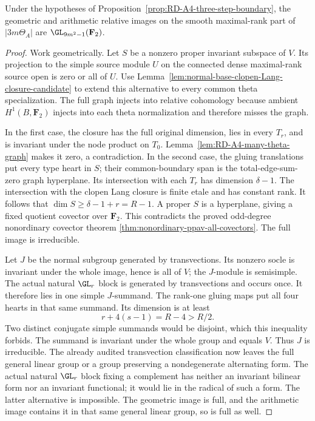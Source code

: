 \begin{theorem}
\label{thm:RD-A4-three-step}
Under the hypotheses of Proposition~\ref{prop:RD-A4-three-step-boundary},
the geometric and arithmetic relative images on the smooth
maximal-rank part of $|3m\Theta_A|$ are
$\GL_{9m^2-1}(\mathbf F_2)$.
\end{theorem}
\begin{proof}
Work geometrically.  Let $S$ be a nonzero proper invariant
subspace of $V$.  Its projection to the simple source module $U$
on the connected dense maximal-rank source open is zero or all
of $U$.  Use Lemma~\ref{lem:normal-base-clopen-Lang-closure-candidate}
to extend this alternative to every common theta specialization.
The full graph injects into relative cohomology because ambient
$H^1(B,\mathbf F_2)$ injects into each theta normalization and
therefore misses the graph.

In the first case, the closure has the full original dimension,
lies in every $T_r$, and is invariant under the node product on
$T_0$.  Lemma~\ref{lem:RD-A4-many-theta-graph} makes it zero, a
contradiction.  In the second case, the gluing translations put
every type heart in $S$; their common-boundary span is the
total-edge-sum-zero graph hyperplane.  Its intersection with
each $T_r$ has dimension $\delta-1$.  The intersection with the
clopen Lang closure is finite etale and has constant rank.
It follows that $\dim S\ge\delta-1+r=R-1$.
A proper $S$ is a hyperplane, giving a fixed quotient covector
over $\mathbf F_2$.  This contradicts the proved odd-degree
nonordinary covector theorem
\ref{thm:nonordinary-ppav-all-covectors}.  The full image is irreducible.

Let $J$ be the normal subgroup generated by transvections.
Its nonzero socle is invariant under the whole image, hence is
all of $V$; the $J$-module is semisimple.  The actual natural
$\GL_r$ block is generated by transvections and occurs once.
It therefore lies in one simple $J$-summand.  The rank-one
gluing maps put all four hearts in that same summand.  Its
dimension is at least
\[
                         r+4(s-1)=R-4>R/2.
\]
Two distinct conjugate simple summands would be disjoint, which
this inequality forbids.  The summand is invariant under the
whole group and equals $V$.  Thus $J$ is irreducible.
The already audited transvection classification
\cite[Theorem~3.6, printed p.~22]{KantorSeress2001} now leaves
the full general linear group or a group preserving a
nondegenerate alternating form.  The actual natural $\GL_r$
block fixing a complement has neither an invariant bilinear
form nor an invariant functional; it would lie in the radical
of such a form.  The latter alternative is impossible.
The geometric image is full, and the arithmetic image contains
it in that same general linear group, so is full as well.
\end{proof}

